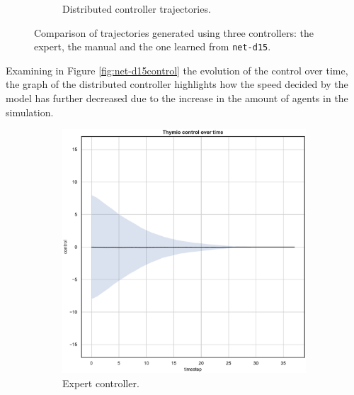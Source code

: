 \begin{figure}[H]
\begin{center}
\begin{subfigure}[h]{0.49\textwidth}
			\caption{Distributed controller trajectories.}
		\end{subfigure}
	\end{center}
	\caption[Evaluation of the trajectories learned by 
	\texttt{net-d15}.]{Comparison 
		of trajectories generated using three controllers: the expert, the manual 
		and the one learned from \texttt{net-d15}.}
	\label{fig:net-d15traj}
\end{figure}


Examining in Figure \ref{fig:net-d15control} the evolution of the control over 
time, the graph of the distributed controller highlights how the speed decided by 
the model has further decreased due to the increase in the amount of agents in 
the simulation.
\begin{figure}[!htb]
	\centering
	\begin{subfigure}[h]{0.3\textwidth}
		\centering
		\includegraphics[width=\textwidth]{contents/images/net-d15/control-overtime-omniscient}%
		\caption{Expert controller.}
	\end{subfigure}
	\hfill
	\begin{subfigure}[h]{0.3\textwidth}
		\centering

\end{subfigure}
\end{figure}
